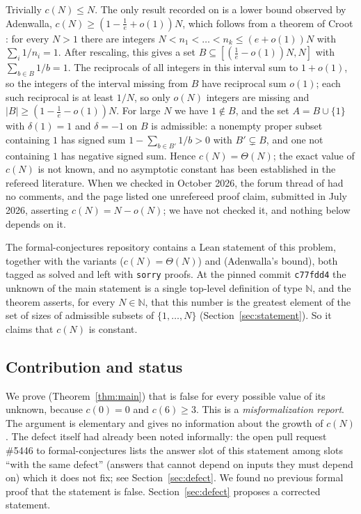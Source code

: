 \documentclass[11pt]{amsart}
\theoremstyle{plain}
\theoremstyle{definition}
\newcommand{\N}{\mathbb{N}}
\begin{document}
Trivially $c(N)\le N$. The only result recorded on \cite{EP319} is a lower bound observed by Adenwalla, $c(N)\ge(1-\frac1e+o(1))N$, which follows from a theorem of Croot \cite{Cr01}: for every $N>1$ there are integers $N<n_1<\dots<n_k\le(e+o(1))N$ with $\sum_i 1/n_i=1$. After rescaling, this gives a set $B\subseteq[(\frac1e-o(1))N,N]$ with $\sum_{b\in B}1/b=1$. The reciprocals of all integers in this interval sum to $1+o(1)$, so the integers of the interval missing from $B$ have reciprocal sum $o(1)$; each such reciprocal is at least $1/N$, so only $o(N)$ integers are missing and $|B|\ge(1-\frac1e-o(1))N$. For large $N$ we have $1\notin B$, and the set $A=B\cup\{1\}$ with $\delta(1)=1$ and $\delta=-1$ on $B$ is admissible: a nonempty proper subset containing $1$ has signed sum $1-\sum_{b\in B'}1/b>0$ with $B'\subsetneq B$, and one not containing $1$ has negative signed sum. Hence $c(N)=\Theta(N)$; the exact value of $c(N)$ is not known, and no asymptotic constant has been established in the refereed literature. When we checked in October 2026, the forum thread of \cite{EP319} had no comments, and the page listed one unrefereed proof claim, submitted in July 2026, asserting $c(N)=N-o(N)$; we have not checked it, and nothing below depends on it.

The formal-conjectures repository \cite{FC} contains a Lean statement  of this problem, together with the variants  ($c(N)=\Theta(N)$) and  (Adenwalla's bound), both tagged as solved and left with \texttt{sorry} proofs. At the pinned commit \texttt{c77fdd4} the unknown of the main statement is a single top-level definition  of type $\N$, and the theorem asserts, for every $N\in\N$, that this number is the greatest element of the set of sizes of admissible subsets of $\{1,\dots,N\}$ (Section~\ref{sec:statement}). So it claims that $c(N)$ is constant.

\subsection*{Contribution and status}
We prove (Theorem~\ref{thm:main}) that  is false for every possible value of its unknown, because $c(0)=0$ and $c(6)\ge 3$. This is a \emph{misformalization report}. The argument is elementary and gives no information about the growth of $c(N)$. The defect itself had already been noted informally: the open pull request \#5446 to formal-conjectures \cite{PR5446} lists the answer slot of this statement among slots ``with the same defect'' (answers that cannot depend on inputs they must depend on) which it does not fix; see Section~\ref{sec:defect}. We found no previous formal proof that the statement is false. Section~\ref{sec:defect} proposes a corrected statement.
\end{document}
